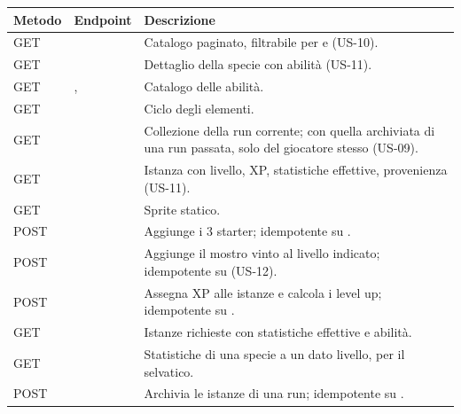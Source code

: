 \documentclass[11pt,a4paper]{article}
\begin{document}
{\small\begin{tabularx}{\linewidth}{@{}L{1.3cm}L{6.1cm}Y@{}}
  \toprule
  Metodo & Endpoint & Descrizione \\
  \midrule
  GET &  & Catalogo paginato, filtrabile per  e  (US-10). \\
  GET &  & Dettaglio della specie con abilità (US-11). \\
  GET & ,  & Catalogo delle abilità. \\
  GET &  & Ciclo degli elementi. \\
  GET &  & Collezione della run corrente; con  quella archiviata di una run passata, solo del giocatore stesso (US-09). \\
  GET &  & Istanza con livello, XP, statistiche effettive, provenienza (US-11). \\
  GET &  & Sprite statico. \\
  POST &  & Aggiunge i 3 starter; idempotente su . \\
  POST &  & Aggiunge il mostro vinto al livello indicato; idempotente su  (US-12). \\
  POST &  & Assegna XP alle istanze e calcola i level up; idempotente su . \\
  GET &  & Istanze richieste con statistiche effettive e abilità. \\
  GET &  & Statistiche di una specie a un dato livello, per il selvatico. \\
  POST &  & Archivia le istanze di una run; idempotente su . \\
  \bottomrule
\end{tabularx}}
\end{document}

